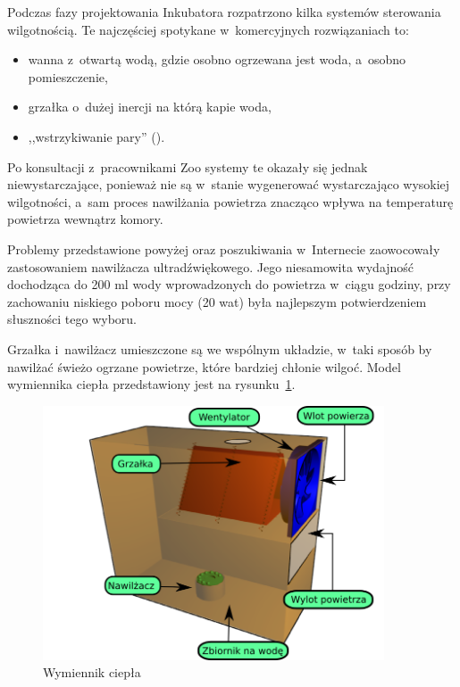 Podczas fazy projektowania Inkubatora rozpatrzono kilka systemów sterowania
wilgotnością. Te najczęściej spotykane w~komercyjnych rozwiązaniach to:
\begin{itemize}
	\item wanna z~otwartą wodą, gdzie osobno ogrzewana jest woda, a~osobno
		pomieszczenie,
	\item grzałka o~dużej inercji na którą kapie woda,
	\item ,,wstrzykiwanie pary'' ().
\end{itemize}
Po konsultacji z~pracownikami Zoo systemy te okazały się jednak niewystarczające,
ponieważ nie są w~stanie wygenerować wystarczająco wysokiej wilgotności, a~sam
proces nawilżania powietrza znacząco wpływa na temperaturę powietrza wewnątrz
komory. 

Problemy przedstawione powyżej oraz poszukiwania w~Internecie zaowocowały
zastosowaniem nawilżacza ultradźwiękowego. Jego niesamowita wydajność dochodząca
do 200 ml wody wprowadzonych do powietrza w~ciągu godziny, przy zachowaniu
niskiego poboru mocy (20 wat) była najlepszym potwierdzeniem słuszności tego wyboru.


Grzałka i~nawilżacz umieszczone są we wspólnym układzie, w~taki sposób by 
nawilżać świeżo ogrzane powietrze, które bardziej chłonie wilgoć. 
Model wymiennika ciepła przedstawiony jest na rysunku~\ref{rys:Wymiennik}.

\begin{figure}[b] 
	\centering\includegraphics[width=0.9\textwidth]{figures/Wymiennik}
	\caption{Wymiennik ciepła}\label{rys:Wymiennik}
\end{figure}


